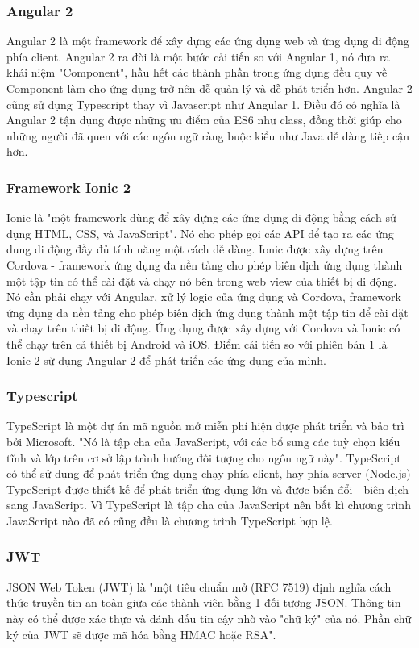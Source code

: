 \documentclass[a4paper,12pt,oneside]{article}
\begin{document}
\subsubsection{Angular 2}
\noindent Angular 2 là một framework để xây dựng các ứng dụng web và ứng dụng di động phía client. Angular 2 ra đời là một bước cải tiến so với Angular 1, nó đưa ra khái niệm "Component", hầu hết các thành phần trong ứng dụng đều quy về Component làm cho ứng dụng trở nên dễ quản lý và dễ phát triển hơn. Angular 2 cũng sử dụng Typescript thay vì Javascript như Angular 1. Điều đó có nghĩa là Angular 2 tận dụng được những ưu điểm của ES6 như class, đồng thời giúp cho những người đã quen với các ngôn ngữ ràng buộc kiểu như Java dễ dàng tiếp cận hơn.

\subsubsection{Framework Ionic 2}
\noindent Ionic là "một framework dùng để xây dựng các ứng dụng di động bằng cách sử dụng HTML, CSS, và JavaScript"\cite{ionic}. Nó cho phép gọi các API để tạo ra các ứng dung di động đầy đủ tính năng một cách dễ dàng.
Ionic được xây dựng trên Cordova - framework ứng dụng đa nền tảng cho phép biên dịch ứng dụng thành một tập tin có thể cài đặt và chạy nó bên trong web view của thiết bị di động. Nó cần phải chạy với Angular, xử lý logic của ứng dụng và Cordova, framework ứng dụng đa nền tảng cho phép biên dịch ứng dụng thành một tập tin để cài đặt và chạy trên thiết bị di động. Ứng dụng được xây dựng với Cordova và Ionic có thể chạy trên cả thiết bị Android và iOS.
Điểm cải tiến so với phiên bản 1 là Ionic 2 sử dụng Angular 2 để phát triển các ứng dụng của mình.

\subsubsection{Typescript}
\noindent TypeScript là một dự án mã nguồn mở miễn phí hiện được phát triển và bảo trì bởi Microsoft. "Nó là tập cha của JavaScript, với các bổ sung các tuỳ chọn kiểu tĩnh và lớp trên cơ sở lập trình hướng đối tượng cho ngôn ngữ này"\cite{typescript}. TypeScript có thể sử dụng để phát triển ứng dụng chạy phía client, hay phía server (Node.js)  
TypeScript được thiết kế để phát triển ứng dụng lớn và được biến đổi - biên dịch sang JavaScript. Vì TypeScript là tập cha của JavaScript nên bất kì chương trình JavaScript nào đã có cũng đều là chương trình TypeScript hợp lệ.
  
\subsubsection{JWT}
\noindent JSON Web Token (JWT) là "một tiêu chuẩn mở (RFC 7519) định nghĩa cách thức truyền tin an toàn giữa các thành viên bằng 1 đối tượng JSON. Thông tin này có thể được xác thực và đánh dấu tin cậy nhờ vào "chữ ký" của nó. Phần chữ ký của JWT sẽ được mã hóa bằng HMAC hoặc RSA"\cite{jwt}.
\end{document}
